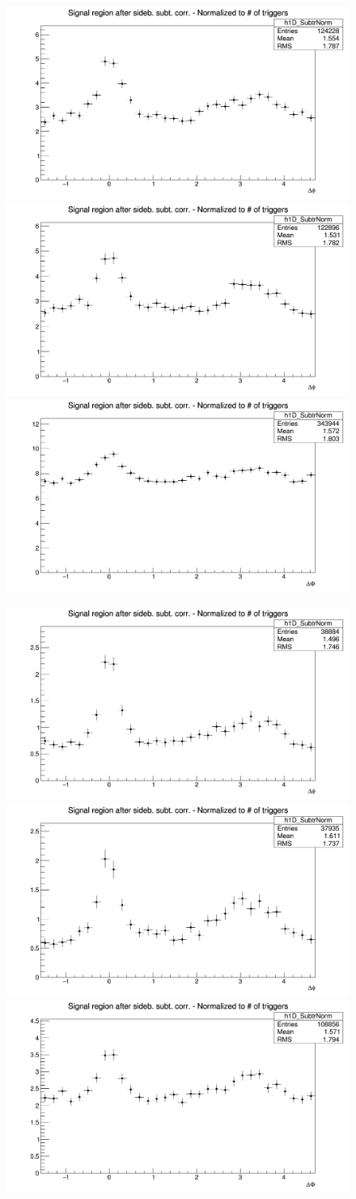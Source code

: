 \begin{figure}[!htbp]
\centering

{\includegraphics[width=0.31\linewidth, height=0.23\linewidth]{figures/Dzero/AzimCorrDistr_Dzero_Canvas_PtIntBins9to11_PoolInt_thrdot3to99dot.png}}
{\includegraphics[width=0.31\linewidth, height=0.23\linewidth]{figures/DplusPlotsweff/AzimCorrDistr_Dplus_Canvas_PtIntBins8to12_PoolInt_thrdot3to99dot.png}}
{\includegraphics[width=0.31\linewidth, height=0.23\linewidth]{figures/Dstar_wEFF/AzimCorrDistr_Dstar_Canvas_PtIntBins7to9_PoolInt_thrdot3to99dot.png}}


{\includegraphics[width=0.31\linewidth, height=0.23\linewidth]{figures/Dzero/AzimCorrDistr_Dzero_Canvas_PtIntBins9to11_PoolInt_thr1dotto99dot.png}}
{\includegraphics[width=0.31\linewidth, height=0.23\linewidth]{figures/DplusPlotsweff/AzimCorrDistr_Dplus_Canvas_PtIntBins8to12_PoolInt_thr1dotto99dot.png}}
{\includegraphics[width=0.31\linewidth, height=0.23\linewidth]{figures/Dstar_wEFF/AzimCorrDistr_Dstar_Canvas_PtIntBins7to9_PoolInt_thr1dotto99dot.png}}



\end{figure}
